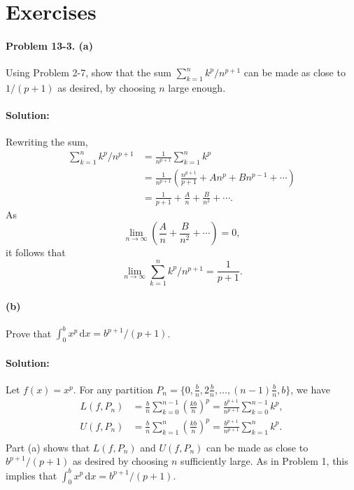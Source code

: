 \documentclass{article}
\begin{document}
\section*{Exercises}

\paragraph{Problem 13-3. (a)} Using Problem 2-7, show that the sum
$\sum_{k = 1}^n k^p/n^{p + 1}$ can be made as close to $1/(p + 1)$ as desired,
by choosing $n$ large enough.

\paragraph{Solution:} Rewriting the sum, \begin{align*}
  \sum_{k = 1}^n k^p/n^{p + 1} &= \frac{1}{n^{p + 1}}\sum_{k = 1}^n k^p \\
    &= \frac{1}{n^{p + 1}}\left(\frac{n^{p + 1}}{p + 1} + An^p + Bn^{p - 1} +
      \cdots\right) \\
    &= \frac{1}{p + 1} + \frac{A}{n} + \frac{B}{n^2} + \cdots.
\end{align*} As \begin{equation*}
  \lim_{n \rightarrow \infty}\left(\frac{A}{n} + \frac{B}{n^2} + \cdots\right)
    = 0,
\end{equation*} it follows that \begin{equation*}
  \lim_{n \rightarrow \infty}\sum_{k = 1}^n k^p/n^{p + 1} = \frac{1}{p + 1}.
\end{equation*}

\paragraph{(b)} Prove that $\int_0^b x^p \,\mathrm{d}x = b^{p + 1}/(p + 1)$.

\paragraph{Solution:} Let $f(x) = x^p$. For any partition $P_n = \{0,
\frac{b}{n}, 2\frac{b}{n}, \ldots, (n - 1)\frac{b}{n}, b\}$, we have
\begin{align*}
  L(f, P_n) &= \frac{b}{n}\sum_{k = 0}^{n - 1}\left(\frac{kb}{n}\right)^p =
    \frac{b^{p + 1}}{n^{p + 1}}\sum_{k = 0}^{n - 1}k^p, \\
  U(f, P_n) &= \frac{b}{n}\sum_{k = 1}^n\left(\frac{kb}{n}\right)^p =
    \frac{b^{p + 1}}{n^{p + 1}}\sum_{k = 1}^nk^p. \\
\end{align*} Part (a) shows that $L(f, P_n)$ and $U(f, P_n)$ can be made as
close to $b^{p + 1}/(p + 1)$ as desired by choosing $n$ sufficiently large. As
in Problem 1, this implies that $\int_0^b x^p \,\mathrm{d}x = b^{p + 1}/(p +
1)$.
\end{document}
